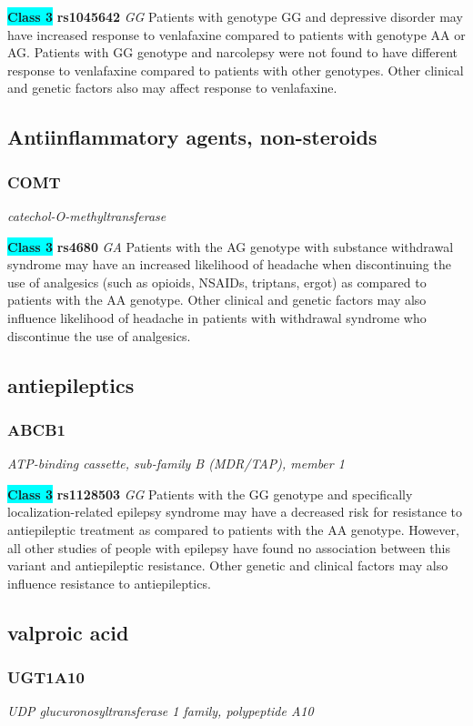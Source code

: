 \documentclass{report}
\begin{document}
\textbf{\colorbox{cyan} {Class 3}} \textbf{ rs1045642 } \textit{ GG }
Patients with genotype GG and depressive disorder may have increased response to venlafaxine compared to patients with genotype AA or AG. Patients with GG genotype and narcolepsy were not found to have different response to venlafaxine compared to patients with other genotypes. Other clinical and genetic factors also may affect response to venlafaxine.\newline\subsection{ Antiinflammatory agents, non-steroids }\subsubsection{ COMT }
\textit{ catechol-O-methyltransferase }

\textbf{\colorbox{cyan} {Class 3}} \textbf{ rs4680 } \textit{ GA }
Patients with the AG genotype with substance withdrawal syndrome may have an increased likelihood of headache when discontinuing the use of analgesics (such as opioids, NSAIDs, triptans, ergot) as compared to patients with the AA genotype. Other clinical and genetic factors may also influence likelihood of headache in patients with withdrawal syndrome who discontinue the use of analgesics.\newline\subsection{ antiepileptics }\subsubsection{ ABCB1 }
\textit{ ATP-binding cassette, sub-family B (MDR/TAP), member 1 }

\textbf{\colorbox{cyan} {Class 3}} \textbf{ rs1128503 } \textit{ GG }
Patients with the GG genotype and specifically localization-related epilepsy syndrome may have a decreased risk for resistance to antiepileptic treatment as compared to patients with the AA genotype. However, all other studies of people with epilepsy have found no association between this variant and antiepileptic resistance. Other genetic and clinical factors may also influence resistance to antiepileptics. \newline\subsection{ valproic acid }\subsubsection{ UGT1A10 }
\textit{ UDP glucuronosyltransferase 1 family, polypeptide A10 }
\end{document}
